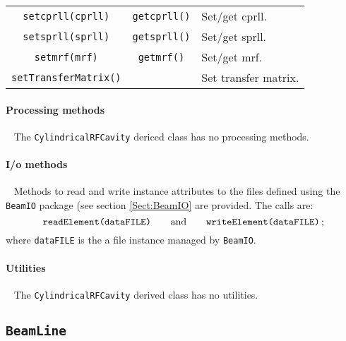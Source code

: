 \begin{table}[h]
\begin{center}
\begin{tabular}{|c|c|p{7cm}|}
      \texttt{setcprll(cprll)}              & \texttt{getcprll()}             & Set/get cprll.                     \\
      \texttt{setsprll(sprll)}              & \texttt{getsprll()}             & Set/get sprll.                     \\
      \texttt{setmrf(mrf)}                  & \texttt{getmrf()}              & Set/get mrf.                     \\
      \texttt{setTransferMatrix()}          &                                & Set transfer matrix.               \\
      \hline
    \end{tabular}
  \end{center}
\end{table}

\paragraph{Processing methods} ~\newline
\noindent
The \texttt{CylindricalRFCavity} dericed class has no processing methods.

\paragraph{I/o methods} ~\newline
\noindent
Methods to read and write instance attributes to the files defined
using the \texttt{BeamIO} package (see section \ref{Sect:BeamIO} are
provided.
The calls are:
\begin{equation}
  \texttt{readElement(dataFILE)} \quad \quad {\rm and }
      \quad \quad \texttt{writeElement(dataFILE)} \,; \nonumber
\end{equation}
where \texttt{dataFILE} is the a file instance managed by \texttt{BeamIO}.

\paragraph{Utilities} ~\newline
\noindent
The \texttt{CylindricalRFCavity} derived class has no utilities.

\FloatBarrier

\subsection{\texttt{BeamLine}}

